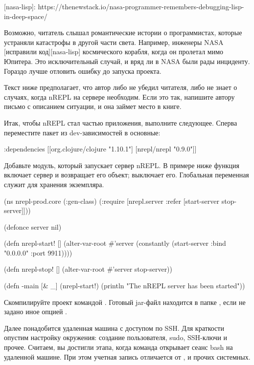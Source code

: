 [nasa-lisp]: https://thenewstack.io/nasa-programmer-remembers-debugging-lisp-in-deep-space/

Возможно, читатель слышал романтические истории о программистах, которые устраняли катастрофы в другой части света. Например, инженеры NASA [исправили код][nasa-lisp] космического корабля, когда он пролетал мимо Юпитера. Это исключительный случай, и вряд ли в NASA были рады инциденту. Гораздо лучше отловить ошибку до запуска проекта.

Текст ниже предполагает, что автор либо не убедил читателя, либо не знает о случаях, когда nREPL на сервере необходим. Если это так, напишите автору письмо с описанием ситуации, и она займет место в книге.

Итак, чтобы nREPL стал частью приложения, выполните следующее. Сперва переместите пакет  из dev-зависимостей в основные:

\begin{english}
  \begin{clojure}
  :dependencies
  [[org.clojure/clojure "1.10.1"]
   [nrepl/nrepl "0.9.0"]]
  \end{clojure}
\end{english}

Добавьте модуль, который запускает сервер nREPL. В примере ниже функция  включает сервер и возвращает его объект;  выключает его. Глобальная переменная  служит для хранения экземпляра.

\begin{english}
  \begin{clojure}
(ns nrepl-prod.core
  (:gen-class)
  (:require
   [nrepl.server :refer [start-server stop-server]]))

(defonce server nil)

(defn nrepl-start! []
  (alter-var-root
   #'server
   (constantly
    (start-server :bind "0.0.0.0" :port 9911))))

(defn nrepl-stop! []
  (alter-var-root #'server stop-server))

(defn -main
  [& _]
  (nrepl-start!)
  (println "The nREPL server has been started"))
  \end{clojure}
\end{english}

Скомпилируйте проект командой . Готовый jar-файл находится в папке , если не задано иное опцией .

Далее понадобится удаленная машина с доступом по SSH. Для краткости опустим настройку окружения: создание пользователя, sudo, SSH-ключи и прочее. Считаем, вы достигли этапа, когда команда  открывает сеанс bash на удаленной машине. При этом учетная запись отличается от ,  и прочих системных.

